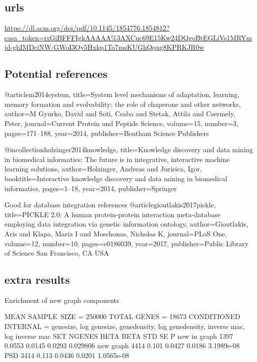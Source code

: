 \subsection{urls}
\url{https://dl.acm.org/doi/pdf/10.1145/1854776.1854812?casa_token=ixGiBFFFIgkAAAAA\%3AXCuc69E15Kw24DQgoBtEGLiVs1MRYmjd-ghIMDciNW-GWoI3Oy5Hxkp1To7msKUGhQqug8KPRKJR0w}

\subsection{Potential references}
@article{m2014system,
  title={System level mechanisms of adaptation, learning, memory formation and evolvability: the role of chaperone and other networks},
  author={M Gyurko, David and Soti, Csaba and Stetak, Attila and Csermely, Peter},
  journal={Current Protein and Peptide Science},
  volume={15},
  number={3},
  pages={171--188},
  year={2014},
  publisher={Bentham Science Publishers}
}

@incollection{holzinger2014knowledge,
  title={Knowledge discovery and data mining in biomedical informatics: The future is in integrative, interactive machine learning solutions},
  author={Holzinger, Andreas and Jurisica, Igor},
  booktitle={Interactive knowledge discovery and data mining in biomedical informatics},
  pages={1--18},
  year={2014},
  publisher={Springer}
}

Good for database integration references
@article{gioutlakis2017pickle,
  title={PICKLE 2.0: A human protein-protein interaction meta-database employing data integration via genetic information ontology},
  author={Gioutlakis, Aris and Klapa, Maria I and Moschonas, Nicholas K},
  journal={PLoS One},
  volume={12},
  number={10},
  pages={e0186039},
  year={2017},
  publisher={Public Library of Science San Francisco, CA USA}
}

\subsection{extra results}
Enrichment of new graph components


 MEAN SAMPLE\ SIZE = 250000
 TOTAL GENES = 18673
 CONDITIONED INTERNAL = genesize, log genesize, genedensity, log genedensity, inverse mac, log inverse mac
SET           NGENES       BETA   BETA STD         SE            P
new in graph    1397     0.0553     0.0145     0.0293     0.029806
new graph       4414      0.101     0.0427     0.0186   3.1989e-08
PSD             3414      0.113     0.0436     0.0201   1.0565e-08



